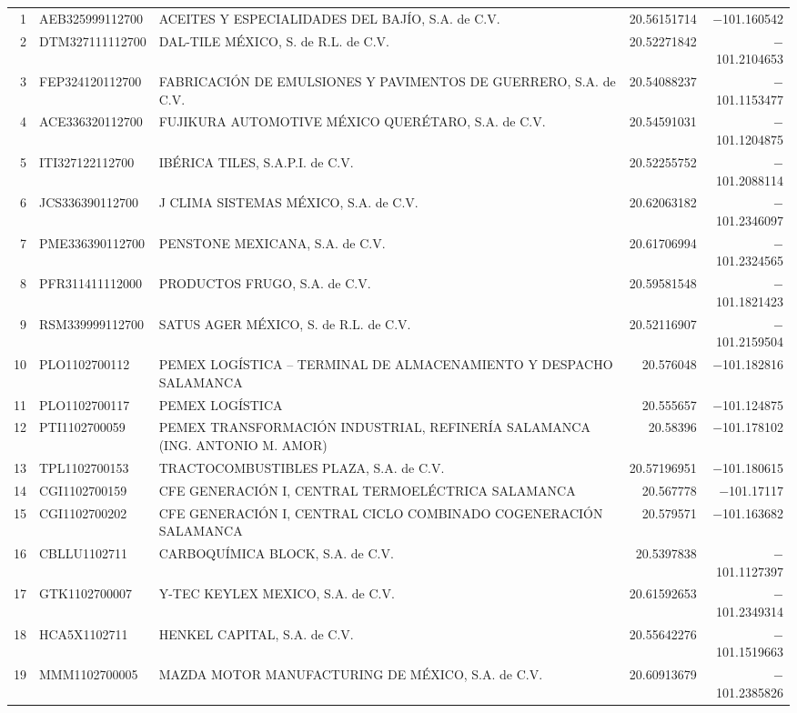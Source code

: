 \begin{longtable}{r l p{7.5cm} r r}
1  & AEB325999112700 & ACEITES Y ESPECIALIDADES DEL BAJÍO, S.A. de C.V. & 20.56151714 & $-$101.160542 \\
2  & DTM327111112700 & DAL-TILE MÉXICO, S. de R.L. de C.V. & 20.52271842 & $-$101.2104653 \\
3  & FEP324120112700 & FABRICACIÓN DE EMULSIONES Y PAVIMENTOS DE GUERRERO, S.A. de C.V. & 20.54088237 & $-$101.1153477 \\
4  & ACE336320112700 & FUJIKURA AUTOMOTIVE MÉXICO QUERÉTARO, S.A. de C.V. & 20.54591031 & $-$101.1204875 \\
5  & ITI327122112700 & IBÉRICA TILES, S.A.P.I. de C.V. & 20.52255752 & $-$101.2088114 \\
6  & JCS336390112700 & J CLIMA SISTEMAS MÉXICO, S.A. de C.V. & 20.62063182 & $-$101.2346097 \\
7  & PME336390112700 & PENSTONE MEXICANA, S.A. de C.V. & 20.61706994 & $-$101.2324565 \\
8  & PFR311411112000 & PRODUCTOS FRUGO, S.A. de C.V. & 20.59581548 & $-$101.1821423 \\
9  & RSM339999112700 & SATUS AGER MÉXICO, S. de R.L. de C.V. & 20.52116907 & $-$101.2159504 \\
10 & PLO1102700112   & PEMEX LOGÍSTICA -- TERMINAL DE ALMACENAMIENTO Y DESPACHO SALAMANCA & 20.576048 & $-$101.182816 \\
11 & PLO1102700117   & PEMEX LOGÍSTICA & 20.555657 & $-$101.124875 \\
12 & PTI1102700059   & PEMEX TRANSFORMACIÓN INDUSTRIAL, REFINERÍA SALAMANCA (ING. ANTONIO M. AMOR) & 20.58396 & $-$101.178102 \\
13 & TPL1102700153   & TRACTOCOMBUSTIBLES PLAZA, S.A. de C.V. & 20.57196951 & $-$101.180615 \\
14 & CGI1102700159   & CFE GENERACIÓN I, CENTRAL TERMOELÉCTRICA SALAMANCA & 20.567778 & $-$101.17117 \\
15 & CGI1102700202   & CFE GENERACIÓN I, CENTRAL CICLO COMBINADO COGENERACIÓN SALAMANCA & 20.579571 & $-$101.163682 \\
16 & CBLLU1102711    & CARBOQUÍMICA BLOCK, S.A. de C.V. & 20.5397838 & $-$101.1127397 \\
17 & GTK1102700007   & Y-TEC KEYLEX MEXICO, S.A. de C.V. & 20.61592653 & $-$101.2349314 \\
18 & HCA5X1102711    & HENKEL CAPITAL, S.A. de C.V. & 20.55642276 & $-$101.1519663 \\
19 & MMM1102700005   & MAZDA MOTOR MANUFACTURING DE MÉXICO, S.A. de C.V. & 20.60913679 & $-$101.2385826 \\

\end{longtable}

